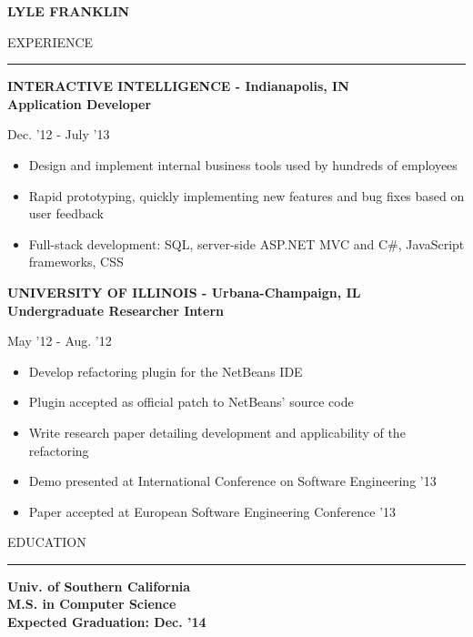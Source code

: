 \documentclass[a4paper,10pt]{article}
\newcommand{\name}[1]{\textbf{\huge{#1}}}
\newcommand{\header}[1]
{
{\Large{\uppercase{#1}}}
\vspace{0.05in}
\hrule
\vspace{0.15in}
}
\newenvironment{details}
{\begin{itemize}[label=\ding{212},leftmargin=0.2in]}
{\end{itemize}}
\begin{document}
\name{LYLE FRANKLIN}
\vspace{0.2in}

\begin{minipage}[t]{0.55\textwidth}
\header{Experience}

\textbf{INTERACTIVE INTELLIGENCE - Indianapolis, IN}\\
\textbf{Application Developer}

Dec. '12 - July '13

\begin{details}
  \item Design and implement internal business tools used by hundreds of employees
  \item Rapid prototyping, quickly implementing new features and bug fixes based on user feedback
  \item Full-stack development: SQL, server-side ASP.NET MVC and C\#, JavaScript frameworks, CSS
\end{details}


\textbf{UNIVERSITY OF ILLINOIS - Urbana-Champaign, IL}\\
\textbf{Undergraduate Researcher Intern}

May '12 - Aug. '12

\begin{details}
  \item Develop refactoring plugin for the NetBeans IDE
  \item Plugin accepted as official patch to NetBeans’ source code
  \item Write research paper detailing development and applicability of the refactoring
  \item Demo presented at International Conference on Software Engineering '13
  \item Paper accepted at European Software Engineering Conference '13
\end{details}


\end{minipage}
\hspace{0.1 in}
\begin{minipage}[t]{0.35\textwidth}
\header{EDUCATION}

\textbf{Univ. of Southern California}\\
\textbf{M.S. in Computer Science}\\
\textbf{Expected Graduation: Dec. '14}

\end{minipage}
\end{document}
